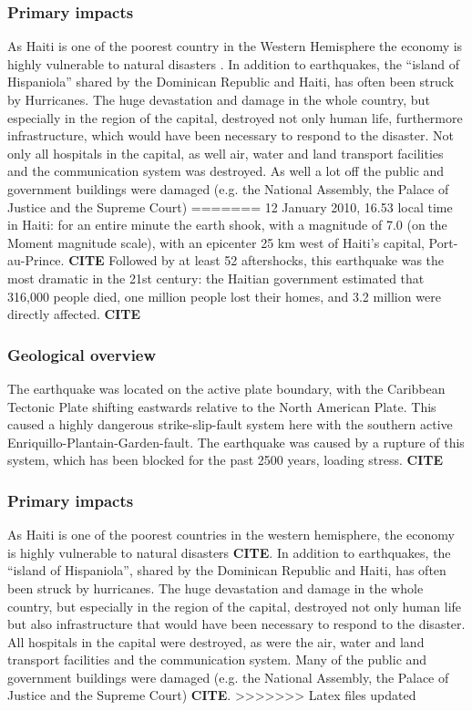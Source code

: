\documentclass[11pt]{article}
\begin{document}
\subsubsection*{Primary impacts}
As Haiti is one of the poorest country in the Western Hemisphere \cite{web:unicef}  the economy is highly vulnerable to natural disasters . In addition to earthquakes, the “island of Hispaniola” shared by the Dominican Republic and Haiti, has often been struck by Hurricanes. 
\newline
The huge devastation and damage in the whole country, but especially in the region of the capital, destroyed not only human life, furthermore infrastructure, which would have been necessary to respond to the disaster. Not only all hospitals in the capital, as well air, water and land transport facilities and the communication system was destroyed. As well a lot off the public and government buildings were damaged (e.g. the National Assembly, the Palace of Justice and the Supreme Court) 
=======
12 January 2010, 16.53 local time in Haiti: for an entire minute the earth shook, with a magnitude of 7.0  (on the Moment magnitude scale), with an epicenter 25 km west of Haiti's capital, Port-au-Prince. \textbf{CITE} Followed by at least 52 aftershocks,  this earthquake was the most dramatic in the 21st century: the Haitian government estimated that 316,000 people died, one million people lost their homes, and 3.2 million were directly affected. \textbf{CITE}

\subsubsection*{Geological overview}

The earthquake was located on the active plate boundary, with the Caribbean Tectonic Plate shifting eastwards relative to the North American Plate. This caused a highly dangerous strike-slip-fault system here with the southern active Enriquillo-Plantain-Garden-fault. The earthquake was caused by a rupture of this system, which has been blocked for the past 2500 years, loading stress. \textbf{CITE}

\subsubsection*{Primary impacts}
As Haiti is one of the poorest countries in the western hemisphere,  the economy is highly vulnerable to natural disasters \textbf{CITE}. In addition to earthquakes, the “island of Hispaniola”, shared by the Dominican Republic and Haiti, has often been struck by hurricanes. The huge devastation and damage in the whole country, but especially in the region of the capital, destroyed not only human life but also infrastructure that would have been necessary to respond to the disaster. All hospitals in the capital were destroyed, as were the air, water and land transport facilities and the communication system. Many of the public and government buildings were damaged (e.g. the National Assembly, the Palace of Justice and the Supreme Court) \textbf{CITE}.
>>>>>>> Latex files updated
\end{document}
